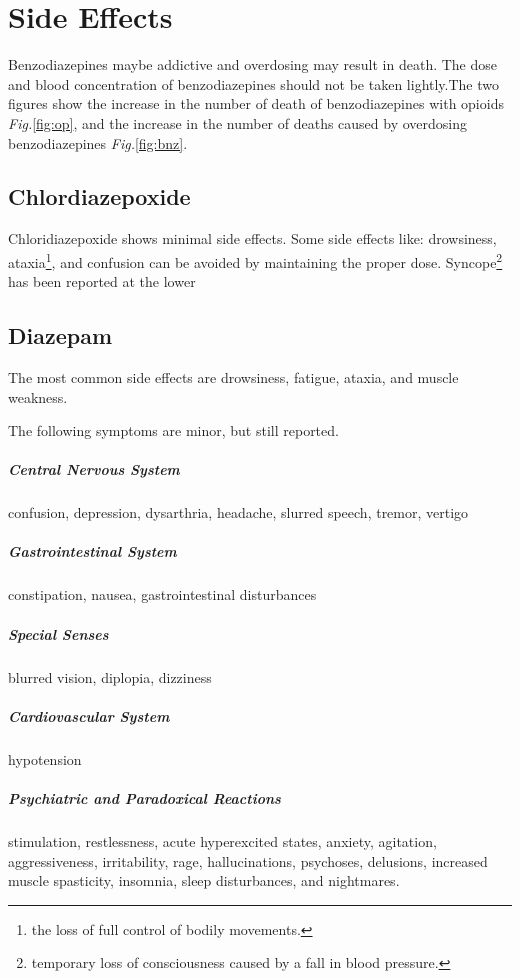\chapter{Side Effects}
Benzodiazepines maybe addictive and overdosing may result in death. The dose and blood concentration of benzodiazepines should not be taken lightly.The two figures show the increase in the number of death of benzodiazepines with opioids \emph{Fig.}\ref{fig:op}, and the increase in the number of deaths caused by overdosing benzodiazepines \emph{Fig.}\ref{fig:bnz}.\cite{death}
\section{Chlordiazepoxide}
Chloridiazepoxide shows minimal side effects. Some side effects like: drowsiness, ataxia\footnote{the loss of full control of bodily movements.}, and confusion can be avoided by maintaining the proper dose. Syncope\footnote{temporary loss of consciousness caused by a fall in blood pressure.} has been reported at the lower  

\section{Diazepam}
The most common side effects are drowsiness, fatigue, ataxia, and muscle weakness.

The following symptoms are minor, but still reported.
\paragraph{Central Nervous System} confusion, depression, dysarthria, headache, slurred speech, tremor, vertigo

\paragraph{Gastrointestinal System} constipation, nausea, gastrointestinal disturbances
\paragraph{Special Senses} blurred vision, diplopia, dizziness
\paragraph{Cardiovascular System} hypotension
\paragraph{Psychiatric and Paradoxical Reactions} stimulation, restlessness, acute hyperexcited states, anxiety, agitation, aggressiveness, irritability, rage, hallucinations, psychoses, delusions, increased muscle spasticity, insomnia, sleep disturbances, and nightmares.
